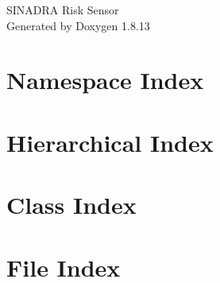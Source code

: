 \documentclass[twoside]{book}
\newcommand{\+}{\discretionary{\mbox{\scriptsize$\hookleftarrow$}}{}{}}
\newcommand{\clearemptydoublepage}{%
  \newpage{\pagestyle{empty}\cleardoublepage}%
}
\begin{document}
\hypersetup{pageanchor=false,
             bookmarksnumbered=true,
             pdfencoding=unicode
            }
\begin{titlepage}
\vspace*{7cm}
\begin{center}%
{\Large S\+I\+N\+A\+D\+RA Risk Sensor }\\
\vspace*{1cm}
{\large Generated by Doxygen 1.8.13}\\
\end{center}
\end{titlepage}
\clearemptydoublepage
{}
\tableofcontents
\clearemptydoublepage
{}
\hypersetup{pageanchor=true}

\chapter{Namespace Index}

\chapter{Hierarchical Index}

\chapter{Class Index}

\chapter{File Index}

\end{document}
